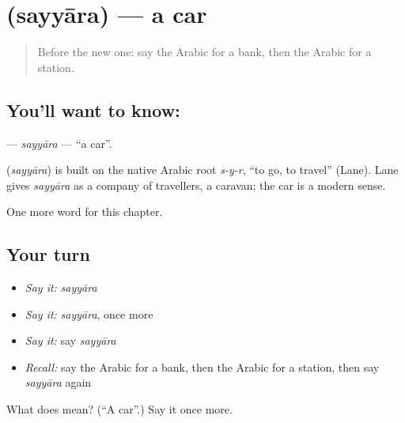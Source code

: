 \section[\texorpdfstring{\ar{سيارة} (sayyāra)}{سيارة (sayyāra)}]{ (sayyāra) — a car}

\label{lesson:AR-C91-sayyara}



\begin{quote}
Before the new one: say the Arabic for a bank, then the Arabic for a station.
\end{quote}

\subsection*{You'll want to know: }
\textbf{} — \emph{sayyāra} — \textquotedblleft{}a car\textquotedblright{}.

\begin{cousinweb}
\textbf{} (\emph{sayyāra}) is built on the native Arabic root \emph{s-y-r}, \textquotedblleft{}to go, to travel\textquotedblright{} (Lane). Lane gives \emph{sayyāra} as a company of travellers, a caravan; the car is a modern sense.
\end{cousinweb}

\begin{grammarlens}[title={What you've built}]
One more word for this chapter.
\end{grammarlens}

\subsection*{Your turn}
\begin{itemize}
\raggedright
  \item \emph{Say it:} \emph{sayyāra}
  \item \emph{Say it:} \emph{sayyāra}, once more
  \item \emph{Say it:} say \emph{sayyāra}
  \item \emph{Recall:} say the Arabic for a bank, then the Arabic for a station, then say \emph{sayyāra} again
\end{itemize}

\begin{tcolorbox}[breakable,colback=teal!4,colframe=teal!35!black,title={Before you move on}]
What does  mean? (\textquotedblleft{}A car\textquotedblright{}.) Say it once more.
\end{tcolorbox}

